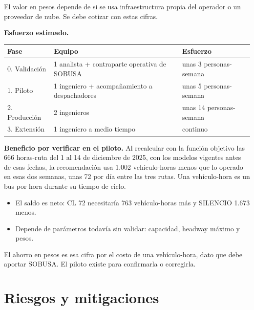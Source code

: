 \documentclass[11pt,a4paper]{article}
\begin{document}
El valor en pesos depende de si se usa infraestructura propia del operador o un proveedor de nube. Se debe cotizar con estas cifras.

\textbf{Esfuerzo estimado.}

\begin{table}[h]
\centering\small
\begin{tabular}{@{}lll@{}}
\toprule
\textbf{Fase} & \textbf{Equipo} & \textbf{Esfuerzo} \\
\midrule
0. Validación & 1 analista + contraparte operativa de SOBUSA & unas 3 personas-semana \\
1. Piloto & 1 ingeniero + acompañamiento a despachadores & unas 5 personas-semana \\
2. Producción & 2 ingenieros & unas 14 personas-semana \\
3. Extensión & 1 ingeniero a medio tiempo & continuo \\
\bottomrule
\end{tabular}
\end{table}

\textbf{Beneficio por verificar en el piloto.} Al recalcular con la función objetivo las 666 horas-ruta del 1 al 14 de diciembre de 2025, con los modelos vigentes antes de esas fechas, la recomendación usa 1.002 vehículo-horas menos que lo operado en esas dos semanas, unas 72 por día entre las tres rutas. Una vehículo-hora es un bus por hora durante su tiempo de ciclo.

\begin{itemize}
  \setlength{\itemsep}{0.1em}
  \item El saldo es neto: CL 72 necesitaría 763 vehículo-horas más y SILENCIO 1.673 menos.
  \item Depende de parámetros todavía sin validar: capacidad, headway máximo y pesos.
\end{itemize}

El ahorro en pesos es esa cifra por el costo de una vehículo-hora, dato que debe aportar SOBUSA. El piloto existe para confirmarla o corregirla.

\section{Riesgos y mitigaciones}
\end{document}
